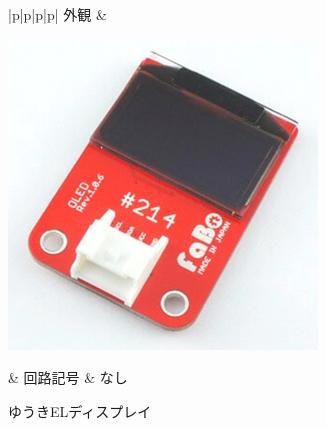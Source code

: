 \begin{figure}[H]
	\begin{tabular}{|p{\colH}|p{\colI}|p{\colH}|p{\colI}|} \hline
	外観 & 
	\begin{minipage}[t]{\linewidth}
    \smallskip
      \centering
      \includegraphics[width=0.5\linewidth]{images/chap05/text05-img032.png}
      \caption{ゆうきELディスプレイ}
      \smallskip
    \end{minipage} &
    回路記号 & なし\\ \hline
  \end{tabular}
\end{figure}
